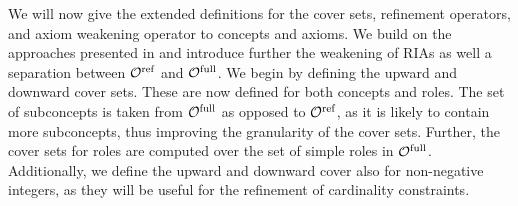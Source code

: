 
We will now give the extended definitions for the cover sets, refinement operators, and axiom weakening operator to \SROIQ concepts and axioms. We build on the approaches presented in \cite{confalonieri2020towards} and introduce further the weakening of RIAs as well a separation between ${\mathcal{O}^\textnormal{ref}}$ and ${\mathcal{O}^\textnormal{full}}$. We begin by defining the upward and downward cover sets. These are now defined for both concepts and roles. The set of subconcepts is taken from ${\mathcal{O}^\textnormal{full}}$ as opposed to ${\mathcal{O}^\textnormal{ref}}$, as it is likely to contain more subconcepts, thus improving the granularity of the cover sets. Further, the cover sets for roles are computed over the set of simple roles in ${\mathcal{O}^\textnormal{full}}$. Additionally, we define the upward and downward cover also for non-negative integers, as they will be useful for the refinement of cardinality constraints.

